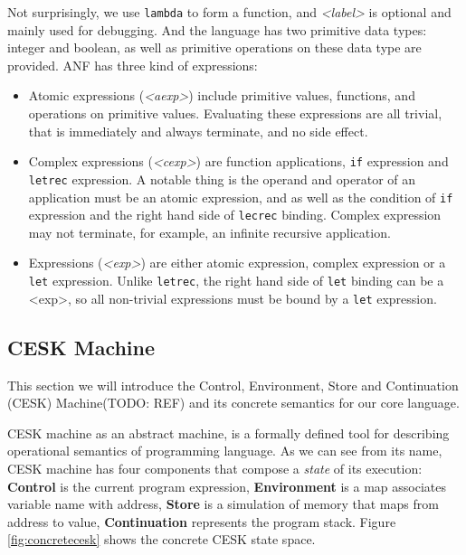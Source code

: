 \documentclass[paper=a4, fontsize=11pt]{scrartcl} %
\numberwithin{equation}{section} %
\numberwithin{figure}{section} %
\numberwithin{table}{section} %
\begin{document}
Not surprisingly, we use \texttt{lambda} to form a function, and \textit{<label>} is optional and mainly used for debugging. And the language has two primitive data types: integer and boolean, as well as primitive operations on these data type are provided. ANF has three kind of expressions:

\begin{itemize}
\item Atomic expressions (\textit{<aexp>}) include primitive values, functions, and operations on primitive values. Evaluating these expressions are all trivial, that is immediately and always terminate, and no side effect.

\item Complex expressions (\textit{<cexp>}) are function applications, \texttt{if} expression and \texttt{letrec} expression. A notable thing is the operand and operator of an application must be an atomic expression, and as well as the condition of \texttt{if} expression and the right hand side of \texttt{lecrec} binding. Complex expression may not terminate, for example, an infinite recursive application.

\item Expressions (\textit{<exp>}) are either atomic expression, complex expression or a \texttt{let} expression. Unlike \texttt{letrec}, the right hand side of \texttt{let} binding can be a <exp>, so all non-trivial expressions must be bound by a \texttt{let} expression.
\end{itemize}


\subsection{CESK Machine}

This section we will introduce the Control, Environment, Store and Continuation (CESK) Machine(TODO: REF) and its concrete semantics for our core language.

CESK machine as an abstract machine, is a formally defined tool for describing operational semantics of programming language. As we can see from its name, CESK machine has four components that compose a \textit{state} of its execution: \textbf{Control} is the current program expression, \textbf{Environment} is a map associates variable name with address, \textbf{Store} is a simulation of memory that maps from address to value, \textbf{Continuation} represents the program stack. Figure \ref{fig:concretecesk} shows the concrete CESK state space. \\
\end{document}
